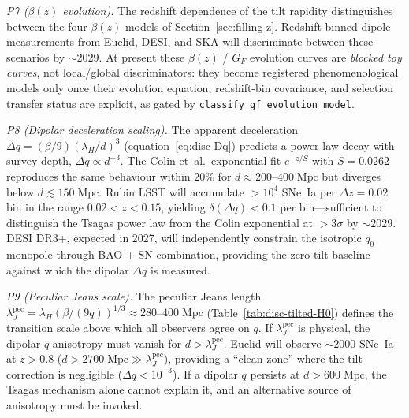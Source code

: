 \emph{P7 ($\beta(z)$ evolution).}
The redshift dependence of the tilt rapidity distinguishes
between the four $\beta(z)$ models of
Section~\ref{sec:filling-z}.  Redshift-binned dipole
measurements from Euclid, DESI, and SKA will discriminate
between these scenarios by $\sim$2029.
At present these $\beta(z)$ / $G_F$ evolution curves are
\emph{blocked toy curves}, not local/global discriminators: they
become registered phenomenological models only once their
evolution equation, redshift-bin covariance, and selection
transfer status are explicit, as gated by
\texttt{classify\_gf\_evolution\_model}.




\emph{P8 (Dipolar deceleration scaling).}
The apparent deceleration
$\Delta q = (\beta/9)(\lambda_H/d)^3$
(equation~\eqref{eq:disc-Dq}) predicts a power-law decay with
survey depth, $\Delta q \propto d^{-3}$.  The Colin et~al.\
exponential fit $e^{-z/S}$ with $S = 0.0262$ reproduces the same
behaviour within $20\%$ for $d \approx 200$--$400\;\mathrm{Mpc}$
but diverges below $d \lesssim 150\;\mathrm{Mpc}$.  Rubin LSST
will accumulate $> 10^4$ SNe~Ia per $\Delta z = 0.02$ bin in the
range $0.02 < z < 0.15$, yielding
$\delta(\Delta q) < 0.1$ per bin---sufficient to distinguish
the Tsagas power law from the Colin exponential at $> 3\sigma$
by $\sim\!2029$.  DESI DR3+, expected in 2027, will independently
constrain the isotropic $q_0$ monopole through BAO + SN
combination, providing the zero-tilt baseline against which the
dipolar $\Delta q$ is measured.

\emph{P9 (Peculiar Jeans scale).}
The peculiar Jeans length
$\lambda_J^{\mathrm{pec}} = \lambda_H(\beta/(9q))^{1/3}
\approx 280$--$400\;\mathrm{Mpc}$
(Table~\ref{tab:disc-tilted-H0}) defines the transition scale above
which all observers agree on $q$.  If $\lambda_J^{\mathrm{pec}}$
is physical, the dipolar $q$ anisotropy must vanish for
$d > \lambda_J^{\mathrm{pec}}$.  Euclid will observe
$\sim\!2000$ SNe~Ia at $z > 0.8$
($d > 2700\;\mathrm{Mpc} \gg \lambda_J^{\mathrm{pec}}$),
providing a ``clean zone'' where the tilt correction is
negligible ($\Delta q < 10^{-3}$).  If a dipolar $q$
persists at $d > 600\;\mathrm{Mpc}$, the Tsagas mechanism
alone cannot explain it, and an alternative source of
anisotropy must be invoked.


